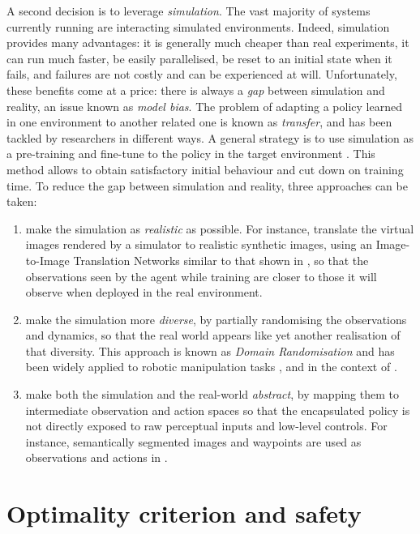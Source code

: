 A second decision is to leverage \emph{simulation}. The vast majority of  systems currently running are interacting simulated environments. Indeed, simulation provides many advantages: it is generally much cheaper than real experiments, it can run much faster, be easily parallelised, be reset to an initial state when it fails, and failures are not costly and can be experienced at will. Unfortunately, these benefits come at a price: there is always a \emph{gap} between simulation and reality, an issue known as \emph{model bias}. The problem of adapting a policy learned in one environment to another related one is known as \emph{transfer}, and has been tackled by researchers in different ways. A general strategy is to use simulation as a pre-training and fine-tune to the policy in the target environment \citep{Liang2019}. This method allows to obtain satisfactory initial behaviour and cut down on training time. To reduce the gap between simulation and reality, three approaches can be taken:
\begin{enumerate}[label=(\roman*)]
	\item make the simulation as \textit{realistic} as possible. For instance, \citet{Pan2017} translate the virtual images rendered by a simulator to realistic synthetic images, using an Image-to-Image Translation Networks similar to that shown in , so that the observations seen by the agent while training are closer to those it will observe when deployed in the real environment.
	\item make the simulation more \textit{diverse}, by partially randomising the observations and dynamics, so that the real world appears like yet another realisation of that diversity. This approach is known as \emph{Domain Randomisation} and has been widely applied to robotic manipulation tasks \citep{Tobin2017,openai2019solving}, and in the context of  \citep{Prakash2019,Pouyanfar2019}.
	\item make both the simulation and the real-world \textit{abstract}, by mapping them to intermediate observation and action spaces so that the encapsulated policy is not directly exposed to raw perceptual inputs and low-level controls. For instance, semantically segmented images and waypoints are used as observations and actions in \citep{Mueller2018}.
\end{enumerate}


\section{Optimality criterion and safety}


